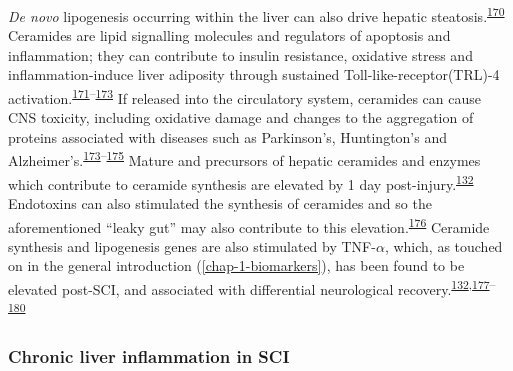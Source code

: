 \documentclass[
]{article}
\begin{document}
\emph{De novo} lipogenesis occurring within the liver can also drive hepatic steatosis.\textsuperscript{\protect\hyperlink{ref-lavoie_regulation_2006}{170}}
Ceramides are lipid signalling molecules and regulators of apoptosis and inflammation; they can contribute to insulin resistance, oxidative stress and inflammation-induce liver adiposity through sustained Toll-like-receptor(TRL)-4 activation.\textsuperscript{\protect\hyperlink{ref-schilling_palmitate_2013}{171}--\protect\hyperlink{ref-pagadala_role_2012}{173}}
If released into the circulatory system, ceramides can cause CNS toxicity, including oxidative damage and changes to the aggregation of proteins associated with diseases such as Parkinson's, Huntington's and Alzheimer's.\textsuperscript{\protect\hyperlink{ref-pagadala_role_2012}{173}--\protect\hyperlink{ref-czubowicz_role_2019}{175}}
Mature and precursors of hepatic ceramides and enzymes which contribute to ceramide synthesis are elevated by 1 day post-injury.\textsuperscript{\protect\hyperlink{ref-sauerbeck_spinal_2014}{132}}
Endotoxins can also stimulated the synthesis of ceramides and so the aforementioned ``leaky gut'' may also contribute to this elevation.\textsuperscript{\protect\hyperlink{ref-chang_endotoxin_2011}{176}}
Ceramide synthesis and lipogenesis genes are also stimulated by TNF-\(\alpha\), which, as touched on in the general introduction (\ref{chap-1-biomarkers}), has been found to be elevated post-SCI, and associated with differential neurological recovery.\textsuperscript{\protect\hyperlink{ref-sauerbeck_spinal_2014}{132},\protect\hyperlink{ref-davies_clinical_2007}{177}--\protect\hyperlink{ref-bikman_role_2012}{180}}

\hypertarget{chronic-liver-inflammation-in-sci}{%
\subsubsection{Chronic liver inflammation in SCI}\label{chronic-liver-inflammation-in-sci}}
\end{document}

